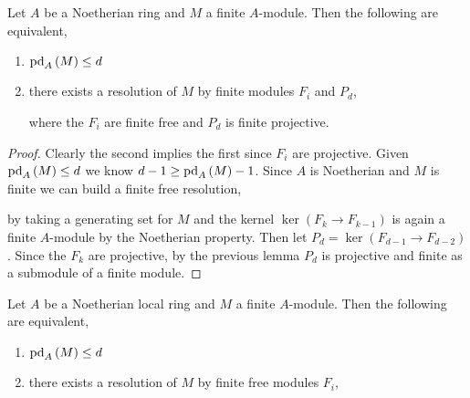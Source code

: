 \documentclass[12pt]{article}
\begin{document}
\begin{lemma}
Let $A$ be a Noetherian ring and $M$ a finite $A$-module. Then the following are equivalent,
\begin{enumerate}
\item $\mathrm{pd}_{A} \left( M \right) \le d$ 
\item there exists a resolution of $M$ by finite modules $F_i$ and $P_d$,
\begin{center}
\end{center}
where the $F_i$ are finite free and $P_d$ is finite projective.
\end{enumerate}
\end{lemma}

\begin{proof}
Clearly the second implies the first since $F_i$ are projective. Given $\mathrm{pd}_{A} \left( M \right) \le d$ we know $d - 1 \ge \mathrm{pd}_{A} \left( M \right) - 1$. Since $A$ is Noetherian and $M$ is finite we can build a finite free resolution,
\begin{center}
\end{center}
by taking a generating set for $M$ and the kernel $\ker{(F_k \to F_{k-1})}$ is again a finite $A$-module by the Noetherian property. Then let $P_d = \ker{(F_{d-1} \to F_{d-2})}$. Since the $F_k$ are projective, by the previous lemma $P_d$ is projective and finite as a submodule of a finite module.
\end{proof}

\begin{lemma}
Let $A$ be a Noetherian local ring and $M$ a finite $A$-module. Then the following are equivalent,
\begin{enumerate}
\item $\mathrm{pd}_{A} \left( M \right) \le d$ 
\item there exists a resolution of $M$ by finite free modules $F_i$,
\begin{center}
\end{center}
\end{enumerate}
\end{lemma}
\end{document}
